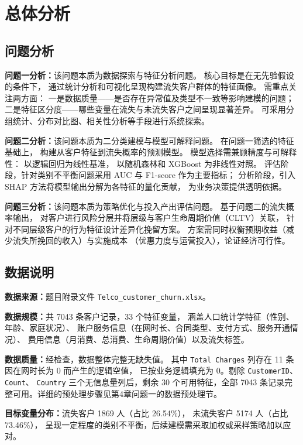 \section{总体分析}

\subsection{问题分析}

\textbf{问题一分析：}该问题本质为数据探索与特征分析问题。
核心目标是在无先验假设的条件下，
通过统计分析和可视化呈现构建流失客户群体的特征画像。
需重点关注两方面：
一是数据质量——是否存在异常值及类型不一致等影响建模的问题；
二是特征区分度——哪些变量在流失与未流失客户之间呈现显著差异。
可采用分组统计、分布对比图、相关性分析等手段进行系统探索。

\textbf{问题二分析：}该问题本质为二分类建模与模型可解释问题。
在问题一筛选的特征基础上，
构建从客户特征到流失概率的预测模型。
模型选择需兼顾精度与可解释性：
以逻辑回归为线性基准，
以随机森林和 XGBoost 为非线性对照。
评估阶段，针对类别不平衡问题采用 AUC 与 F1-score 作为主要指标；
分析阶段，引入 SHAP 方法将模型输出分解为各特征的量化贡献，
为业务决策提供透明依据。

\textbf{问题三分析：}该问题本质为策略优化与投入产出评估问题。
基于问题二的流失概率输出，
对客户进行风险分层并将层级与客户生命周期价值（CLTV）关联，
针对不同层级客户的行为特征设计差异化挽留方案。
方案需同时权衡预期收益（减少流失所挽回的收入）与实施成本
（优惠力度与运营投入），论证经济可行性。

\subsection{数据说明}

\textbf{数据来源：}题目附录文件 \texttt{Telco\_customer\_churn.xlsx}。

\textbf{数据规模：}共 7043 条客户记录，33 个特征变量，
涵盖人口统计学特征（性别、年龄、家庭状况）、
账户服务信息（在网时长、合同类型、支付方式、服务开通情况）、
费用信息（月消费、总消费、生命周期价值）以及流失标签。

\textbf{数据质量：}经检查，数据整体完整无缺失值。
其中 \texttt{Total Charges} 列存在 11 条因在网时长为 0 而产生的逻辑空值，
已按业务逻辑填充为 0。剔除 \texttt{CustomerID}、\texttt{Count}、
\texttt{Country} 三个无信息量列后，剩余 30 个可用特征，全部 7043 条记录完整可用。详细的预处理步骤见第4章问题一的数据预处理节。

\textbf{目标变量分布：}流失客户 1869 人（占比 26.54\%），
未流失客户 5174 人（占比 73.46\%），
呈现一定程度的类别不平衡，后续建模需采取加权或采样策略加以应对。

